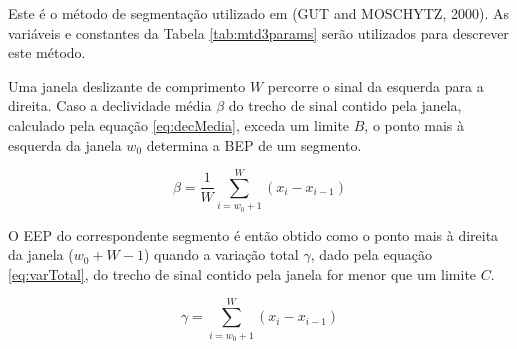 \documentclass[
	12pt,				%
	openright,			%
	oneside,
	a4paper,			%
	english,			%
	francais,			%
	spanish,			%
	brazil				%
	]{abntex2}
\begin{document}
	Este é o método de segmentação utilizado em (GUT and MOSCHYTZ, 2000). As variáveis e constantes da Tabela \ref{tab:mtd3params} serão utilizados para descrever este método.
	
\begin{table}[htb]
\end{table}
	
	Uma janela deslizante de comprimento $W$ percorre o sinal da esquerda para a direita. Caso a declividade média $\beta$ do trecho de sinal contido pela janela, calculado pela equação \ref{eq:decMedia}, exceda um limite $B$, o ponto mais à esquerda da janela $w_0$ determina a BEP de um segmento.
	
\begin{equation}
\label{eq:decMedia}
	\beta = \frac{1}{W}\sum_{i=w_0+1}^{W}(x_i - x_{i-1})
\end{equation}
	
	O EEP do correspondente segmento é então obtido como o ponto mais à direita da janela ($w_0 + W - 1$) quando a variação total $\gamma$, dado pela equação \ref{eq:varTotal}, do trecho de sinal contido pela janela for menor que um limite $C$.

\begin{equation}
\label{eq:varTotal}
	\gamma = \sum_{i=w_0+1}^{W}(x_i - x_{i-1})
\end{equation}
	
\end{document}
